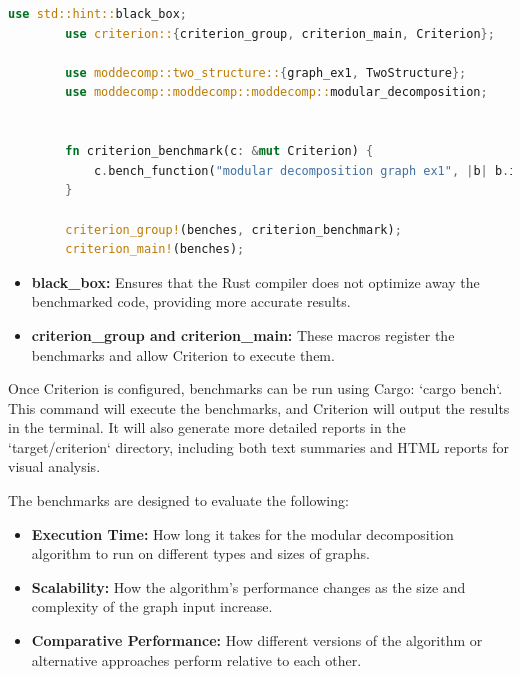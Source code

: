 \begin{myex}
    \begin{lstlisting}[language=Rust, style=rust, caption={Example of benchmark code for modular decomposition}, label={lst:rust-example-of-benchmark-code}, firstnumber=1]
        use std::hint::black_box;
        use criterion::{criterion_group, criterion_main, Criterion};

        use moddecomp::two_structure::{graph_ex1, TwoStructure};
        use moddecomp::moddecomp::moddecomp::modular_decomposition;


        fn criterion_benchmark(c: &mut Criterion) {
            c.bench_function("modular decomposition graph ex1", |b| b.iter(|| modular_decomposition(black_box(&mut graph_ex1()), black_box(None))));
        }

        criterion_group!(benches, criterion_benchmark);
        criterion_main!(benches);
    \end{lstlisting}
\end{myex}

\begin{itemize}
    \item \textbf{black\_box:} Ensures that the Rust compiler does not optimize away the benchmarked code, providing more accurate results.
    \item \textbf{criterion\_group and criterion\_main:} These macros register the benchmarks and allow Criterion to execute them.
\end{itemize}

Once Criterion is configured, benchmarks can be run using Cargo: `cargo bench`.
This command will execute the benchmarks, and Criterion will output the results in the terminal.
It will also generate more detailed reports in the `target/criterion` directory, including both text summaries and HTML reports for visual analysis.

The benchmarks are designed to evaluate the following:
\begin{itemize}
    \item \textbf{Execution Time:} How long it takes for the modular decomposition algorithm to run on different types and sizes of graphs.
    \item \textbf{Scalability:} How the algorithm’s performance changes as the size and complexity of the graph input increase.
    \item \textbf{Comparative Performance:} How different versions of the algorithm or alternative approaches perform relative to each other.
\end{itemize}

